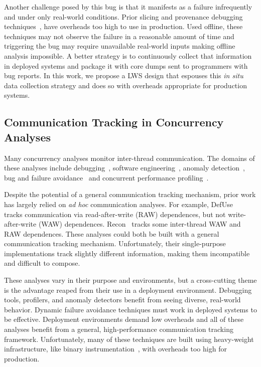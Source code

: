 \documentclass[10pt,nocopyrightspace]{sigplanconf}
\newcommand{\lws}{LWS\xspace}
\begin{document}
Another challenge posed by this bug is that it manifests as a failure
infrequently and under only real-world conditions.  Prior slicing and
provenance debugging
techniques~\cite{tipslicingsurvey,thinslicing,whylineicse}, have overheads too
high to use in production.  Used offline, these techniques may not observe the
failure in a reasonable amount of time and triggering the bug may require
unavailable real-world inputs making offline analysis impossible.   A better
strategy is to continuously collect that information in deployed systems and
package it with core dumps sent to programmers with bug reports.  In this work,
we propose a \lws design that espouses this {\em in situ} data
collection strategy and does so with overheads appropriate for production
systems.


\subsection{Communication Tracking in Concurrency Analyses}
\label{sec:background:comm}

Many concurrency analyses monitor inter-thread
communication.  The domains of these analyses include 
debugging~\cite{defuse,conseq,recon,bugaboo,raceslicing,fasttrack,falcon},
software engineering~\cite{oshajava,oshatr}, anomaly
detection~\cite{avio,dmtracker,cci,daikon}, bug and failure
avoidance~\cite{aviso,cfix} and concurrent performance
profiling~\cite{threadcriticality,schedpredictionmodel}.  

Despite the potential of a general communication tracking mechanism, prior work
has largely relied on {\em ad hoc} communication analyses.  For example,
DefUse~\cite{defuse} tracks communication via read-after-write (RAW)
dependences, but not write-after-write (WAW) dependences.  Recon~\cite{recon}
tracks some inter-thread WAW and RAW dependences.  These analyses could both be
built with a general communication tracking mechanism.  Unfortunately, their
single-purpose implementations track slightly different information, making
them incompatible and difficult to compose.

These analyses vary in their purpose and environments, but a cross-cutting
theme is the advantage reaped from their use in a deployment environment.
Debugging tools, profilers, and anomaly detectors benefit from seeing diverse,
real-world behavior.  Dynamic failure avoidance techniques must work in
deployed systems to be effective.  Deployment environments demand low overheads
and all of these analyses benefit from a general, high-performance
communication tracking framework.  Unfortunately, many of these techniques are built using heavy-weight infrastructure, like binary instrumentation~\cite{pin}, with overheads too high for production.  
\end{document}
